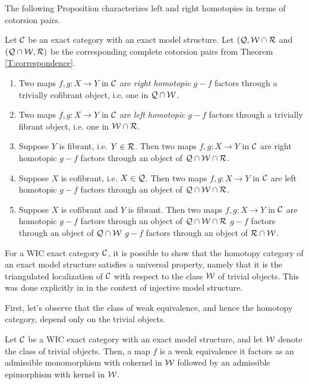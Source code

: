 The following Proposition characterizes left and right homotopies in terms of cotorsion pairs.

\begin{prop}{\cite[Proposition~2.5]{G7}}\label{prop:gil_homotopy}
  Let $\mathcal{C}$ be an exact category with an exact model structure. Let $(\mathcal{Q},\mathcal{W}\cap\mathcal{R}$ and $(\mathcal{Q}\cap\mathcal{W},\mathcal{R})$ be the corresponding complete cotorsion pairs from Theorem \ref{T:correspondence}.
  \begin{enumerate}[label=(\arabic*)]
    \item Two maps $f,g:X\to Y$ in $\mathcal{C}$ are \emph{right homotopic} \iff $g-f$ factors through a trivially cofibrant object, i.e. one in $\mathcal{Q}\cap\mathcal{W}$.
    \item Two maps $f,g:X\to Y$ in $\mathcal{C}$ are \emph{left homotopic} \iff $g-f$ factors through a trivially fibrant object, i.e. one in $\mathcal{W}\cap\mathcal{R}$.
    \item Suppose $Y$ is fibrant, i.e. $Y\in \mathcal{R}$. Then two maps $f,g:X\to Y$ in $\mathcal{C}$ are right homotopic \iff $g-f$ factors through an object of $\mathcal{Q}\cap\mathcal{W}\cap\mathcal{R}$.
    \item Suppose $X$ is cofibrant, i.e. $X\in\mathcal{Q}$. Then two maps $f,g:X\to Y$ in $\mathcal{C}$ are left homotopic \iff $g-f$ factors through an object of $\mathcal{Q}\cap\mathcal{W}\cap\mathcal{R}$.
      \item\label{prop:gil_homotopy.5} Suppose $X$ is cofibrant and $Y$ is fibrant. Then two maps $f,g:X\to Y$ in $\mathcal{C}$ are homotopic \iff $g-f$ factors through an object of $\mathcal{Q}\cap\mathcal{W}\cap\mathcal{R}$ \iff $g-f$ factors through an object of $\mathcal{Q}\cap\mathcal{W}$ \iff $g-f$ factors through an object of $\mathcal{R}\cap\mathcal{W}$.
  \end{enumerate}
\end{prop}

For a WIC exact category $\mathcal{C}$, it is possible to show that the homotopy category of an exact model structure satisfies a universal property, namely that it is the triangulated localization of $\mathcal{C}$ with respect to the class $\mathcal{W}$ of trivial objects. This was done explicitly in \cite{G7} in the context of injective model structure.

First, let's observe that the class of weak equivalence, and hence the homotopy category, depend only on the trivial objects.

\begin{lem}{\cite[Lemma~3.1]{G7}}
  Let $\mathcal{C}$ be a WIC exact category with an exact model structure, and let $\mathcal{W}$ denote the class of trivial objects. Then, a map $f$ is a weak equivalence \iff it factors as an admissible monomorphism with cokernel in $\mathcal{W}$ followed by an admissible epimorphism with kernel in $\mathcal{W}$.
\end{lem}


